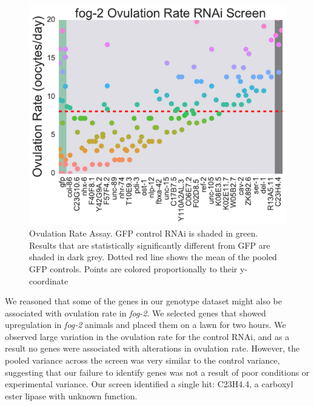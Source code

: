\documentclass[9pt,twocolumn,twoside]{gsag3jnl}
\newcommand{\fog}{\emph{fog-2}}
\begin{document}

\begin{figure}[htbp]
\renewcommand{\familydefault}{\sfdefault}\normalfont{}
\centering
\includegraphics[width=\linewidth]{../output/figs/final_figs/oocyte_rate_assay.pdf}
\caption{Ovulation Rate Assay. GFP control RNAi is shaded in green. Results that are statistically significantly different from GFP are shaded in dark grey. Dotted red line shows the mean of the pooled GFP controls. Points are colored proportionally to their y-coordinate
}%
\label{fig:oocytedropping}
\end{figure}

We reasoned that some of the genes in our genotype dataset might also be associated with ovulation rate in \fog{}. We selected genes that showed upregulation in \fog{} animals and placed them on a lawn for two hours. We observed large variation in the ovulation rate for the control RNAi, and as a result no genes were associated with alterations in ovulation rate. However, the pooled variance across the screen was very similar to the control variance, suggesting that our failure to identify genes was not a result of poor conditions or experimental variance. Our screen identified a single hit: C23H4.4, a carboxyl ester lipase with unknown function.
\end{document}
